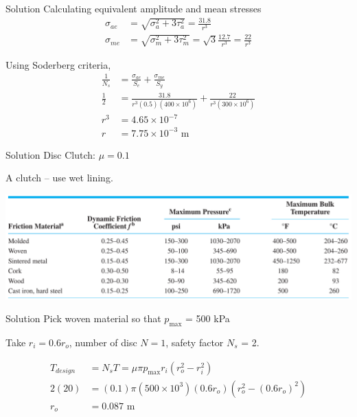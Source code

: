 \documentclass[10pt, svgnames]{beamer}
\begin{document}
\begin{frame}[label={sec:orgb471e2f}]{Solution}
Calculating equivalent amplitude and mean stresses
\begin{align*}
  \sigma_{ae} &= \sqrt{\sigma_{a}^{2} + 3 \tau_{a}^{2}} = \frac{31.8}{r^{3}} \\
  \sigma_{me} &= \sqrt{\sigma_{m}^{2} + 3 \tau_{m}^{2}} = \sqrt{3}\frac{12.7}{r^{3}} = \frac{22}{r^3}
\end{align*}

Using Soderberg criteria,
\begin{align*}
  \frac{1}{N_{s}} &= \frac{\sigma_{ae}}{S_{e}} + \frac{\sigma_{me}}{S_{y}} \\
  \frac{1}{2} &= \frac{31.8}{r^{3}(0.5)(400 \times 10^{6})} + \frac{22}{r^{3}(300 \times 10^{6})} \\
  r^{3} &= 4.65 \times 10^{-7} \\
  r &= 7.75 \times 10^{-3} \text{ m}
\end{align*}
\end{frame}

\begin{frame}[label={sec:org42d61bc}]{Solution}
Disc Clutch: \(\mu = 0.1\)

A clutch -- use wet lining.

\begin{center}
\includegraphics[height=0.4\textheight]{./pictures/dry-materials.png}
\end{center}
\end{frame}

\begin{frame}[label={sec:orgc532e64}]{Solution}
Pick woven material so that \(p_{\max}\) = 500 kPa

Take \(r_i = 0.6 r_o\), number of disc \(N = 1\), safety factor \(N_s\) = 2.

\begin{align*}
  T_{design} &= N_s T = \mu \pi p_{\max} r_i \left( r_o^2 - r_i^2 \right) \\
  2(20) &= (0.1) \pi (500 \times 10^3) (0.6 r_o) \left( r_o^2 - (0.6r_o)^2 \right) \\
  r_o &= 0.087 \text{ m}
\end{align*}
\end{frame}
\end{document}
